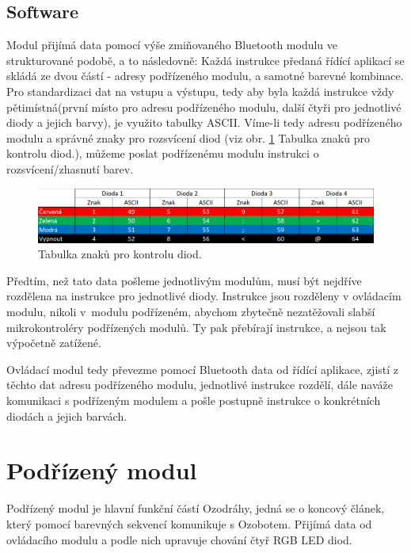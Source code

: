         \subsection{Software}
        Modul přijímá data pomocí výše zmiňovaného Bluetooth modulu ve strukturované podobě, a to následovně: Každá instrukce předaná řídící aplikací se skládá ze dvou částí - adresy podřízeného modulu, a samotné barevné kombinace. Pro standardizaci dat na vstupu a výstupu, tedy aby byla každá instrukce vždy pětimístná(první místo pro adresu podřízeného modulu, další čtyři pro jednotlivé diody a jejich barvy), je využito tabulky ASCII. Víme-li tedy adresu podřízeného modulu a správné znaky pro rozsvícení diod (viz obr. \ref{fig:ascii-codes} Tabulka znaků pro kontrolu diod.), můžeme poslat podřízenému modulu instrukci o rozsvícení/zhasnutí barev. 

\begin{figure}[h!]
          \includegraphics[width=\textwidth]{images/ascii_color_codes.png}
          \caption{Tabulka znaků pro kontrolu diod.}
          \label{fig:ascii-codes}
        \end{figure}

        Předtím, než tato data pošleme jednotlivým modulům, musí být nejdříve rozdělena na instrukce pro jednotlivé diody. Instrukce jsou rozděleny v ovládacím modulu, nikoli v~modulu podřízeném, abychom zbytečně nezatěžovali slabší mikrokontroléry podřízených modulů. Ty pak přebírají  instrukce, a nejsou tak výpočetně zatížené.

        Ovládací modul tedy převezme pomocí Bluetooth data od řídící aplikace, zjistí z~ těchto dat adresu podřízeného modulu, jednotlivé instrukce rozdělí, dále naváže komunikaci s podřízeným modulem a pošle postupně instrukce o konkrétních diodách a jejich barvách.
        
    \section{Podřízený modul}
        Podřízený modul je hlavní funkční částí Ozodráhy, jedná se o koncový článek, který pomocí barevných sekvencí komunikuje s Ozobotem. Přijímá data od ovládacího modulu a podle nich upravuje chování čtyř RGB LED diod. 

